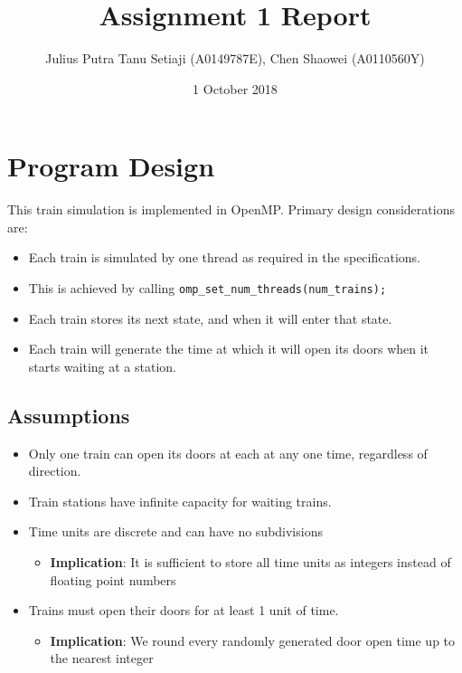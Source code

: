 \documentclass[a4paper,12pt]{article}
\title{Assignment 1 Report}
\author{Julius Putra Tanu Setiaji (A0149787E), Chen Shaowei (A0110560Y)}
\date{1 October 2018}
\begin{document}
	\maketitle
	
	\section{Program Design}
	This train simulation is implemented in OpenMP. Primary design considerations are:
	\begin{itemize}
		\item Each train is simulated by one thread as required in the specifications.
		\item This is achieved by calling \texttt{omp_set_num_threads(num_trains);}
		\item Each train stores its next state, and when it will enter that state.
		\item Each train will generate the time at which it will open its doors when it starts waiting at a station.
	\end{itemize}
	
	\subsection{Assumptions}
	
	\begin{itemize}
		\item Only one train can open its doors at each at any one time, regardless of direction.
		\item Train stations have infinite capacity for waiting trains.
		\item Time units are discrete and can have no subdivisions
		\begin{itemize}
			\item \textbf{Implication}: It is sufficient to store all time units as integers instead of floating point numbers
		\end{itemize}
		\item Trains must open their doors for at least 1 unit of time.
		\begin{itemize}
			\item \textbf{Implication}: We round every randomly generated door open time up to the nearest integer
  		\end{itemize}
	\end{itemize}
	
\end{document}
